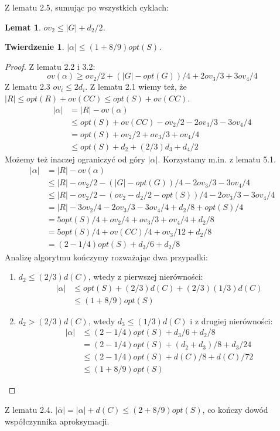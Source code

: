 \documentclass[12pt]{article}
\newtheorem{theorem}{Twierdzenie}[section]
\newtheorem{lemma}{Lemat}[section]
\begin{document}
Z lematu 2.5, sumując po wszystkich cyklach:
\begin{lemma}
$ov_2 \leq |G| + d_2/2$.
\end{lemma}
\begin{theorem}
$|\alpha| \leq (1+8/9)opt(S)$.
\end{theorem}
\begin{proof}
Z lematu 2.2 i 3.2:
\[ov(\alpha) \geq ov_2/2+(|G|-opt(G))/4+2ov_3/3+3ov_4/4\]
Z lematu 2.3 $ov_i \leq 2d_i$. Z lematu 2.1 wiemy też, że $|R| \leq opt(R)+ov(CC) \leq opt(S)+ov(CC)$.
\begin{align*}
    |\alpha| & = |R|-ov(\alpha) \\
        & \leq opt(S)+ov(CC)-ov_2/2-2ov_3/3-3ov_4/4 \\
        & = opt(S)+ov_2/2+ov_3/3+ov_4/4 \\
        & \leq opt(S)+d_2+(2/3)d_3+d_4/2
\end{align*}
Możemy też inaczej ograniczyć od góry $|\alpha|$. Korzystamy m.in. z lematu 5.1.
\begin{align*}
    |\alpha| & = |R|-ov(\alpha) \\
        & \leq |R|-ov_2/2-(|G|-opt(G))/4-2ov_3/3-3ov_4/4 \\
        & \leq |R|-ov_2/2-(ov_2-d_2/2-opt(S))/4-2ov_3/3-3ov_4/4 \\
        & = |R|-3ov_2/4-2ov_3/3-3ov_4/4+d_2/8+opt(S)/4 \\
        & = 5opt(S)/4+ov_2/4+ov_3/3+ov_4/4+d_2/8 \\
        & = 5opt(S)/4+ov(CC)/4+ov_3/12+d_2/8 \\
        & = (2-1/4)opt(S)+d_3/6+d_2/8
\end{align*}
Analizę algorytmu kończymy rozważając dwa przypadki:
\begin{enumerate}
\item $d_2 \leq (2/3)d(C)$, wtedy z pierwszej nierówności:
    \begin{align*}
        |\alpha| & \leq opt(S)+(2/3)d(C)+(2/3)(1/3)d(C) \\
            & \leq (1+8/9)opt(S)
    \end{align*}
\item $d_2 > (2/3)d(C)$, wtedy $d_3 \leq (1/3)d(C)$ i z drugiej nierówności:
    \begin{align*}
        |\alpha| & \leq (2-1/4)opt(S)+d_3/6+d_2/8 \\
            & = (2-1/4)opt(S)+(d_2+d_3)/8+d_3/24 \\
            & \leq (2-1/4)opt(S)+d(C)/8+d(C)/72 \\
            & \leq (1+8/9)opt(S)
    \end{align*}
\end{enumerate}
\end{proof}
Z lematu 2.4. $|\overline{\alpha}| = |\alpha|+d(C) \leq (2+8/9)opt(S)$, co kończy dowód współczynnika aproksymacji.
\end{document}
